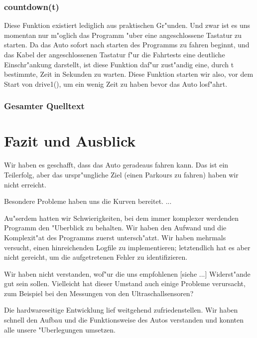 \documentclass[a4paper,12pt]{article}
\begin{document}
\subsubsection{countdown(t)}\label{sec2.2.7}

Diese Funktion existiert lediglich aus praktischen Gr"unden.
Und zwar ist es uns momentan nur m"oglich das Programm "uber eine angeschlossene Tastatur zu starten.
Da das Auto sofort nach starten des Programms zu fahren beginnt, und das Kabel der angeschlossenen Tastatur f"ur die Fahrtests eine deutliche Einschr"ankung darstellt, ist diese Funktion daf"ur zust"andig eine, durch t bestimmte, Zeit in Sekunden zu warten.
Diese Funktion starten wir also, vor dem Start von drive1(), um ein wenig Zeit zu haben bevor das Auto losf"ahrt.

\subsubsection{Gesamter Quelltext}\label{sec2.2.8}


\section{Fazit und Ausblick}\label{sec3}

Wir haben es geschafft, dass das Auto geradeaus fahren kann.
Das ist ein Teilerfolg, aber das urspr"ungliche Ziel (einen Parkours zu fahren) haben wir nicht erreicht.

Besondere Probleme haben uns die Kurven bereitet. ...

Au"serdem hatten wir Schwierigkeiten, bei dem immer komplexer werdenden Programm den "Uberblick zu behalten.
Wir haben den Aufwand und die Komplexit"at des Programms zuerst untersch"atzt.
Wir haben mehrmals versucht, einen hinreichenden Logfile zu implementieren; letztendlich hat es aber nicht gereicht, um die aufgetretenen Fehler zu identifizieren.

Wir haben nicht verstanden, wof"ur die uns empfohlenen [siehe ...] Widerst"ande gut sein sollen.
Vielleicht hat dieser Umstand auch einige Probleme verursacht, zum Beispiel bei den Messungen von den Ultraschallsensoren?

Die hardwareseitige Entwicklung lief weitgehend zufriedenstellen.
Wir haben schnell den Aufbau und die Funktionsweise des Autos verstanden und konnten alle unsere "Uberlegungen umsetzen.
\end{document}
